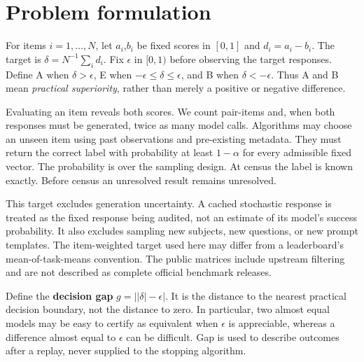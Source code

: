 \section{Problem formulation}\label{sec:3}\label{problem-formulation}

For items \(i=1,\ldots,N\), let \(a_i\),\(b_i\) be fixed scores in \([0,1]\) and \(d_i=a_i-b_i\). The target is \(\delta=N^{-1}\sum_i d_i\). Fix \(\epsilon\) in \([0,1)\) before observing the target responses. Define A when \(\delta>\epsilon\), E when \(-\epsilon\le\delta\le\epsilon\), and B when \(\delta<-\epsilon\). Thus A and B mean \emph{practical superiority}, rather than merely a positive or negative difference.

Evaluating an item reveals both scores. We count pair-items and, when both responses must be generated, twice as many model calls. Algorithms may choose an unseen item using past observations and pre-existing metadata. They must return the correct label with probability at least \(1-\alpha\) for every admissible fixed vector. The probability is over the sampling design. At census the label is known exactly. Before census an unresolved result remains unresolved.

This target excludes generation uncertainty. A cached stochastic response is treated as the fixed response being audited, not an estimate of its model's success probability. It also excludes sampling new subjects, new questions, or new prompt templates. The item-weighted target used here may differ from a leaderboard's mean-of-task-means convention. The public matrices include upstream filtering and are not described as complete official benchmark releases.

Define the \textbf{decision gap} \(g=\bigl||\delta|-\epsilon\bigr|\). It is the distance to the nearest practical decision boundary, not the distance to zero. In particular, two almost equal models may be easy to certify as equivalent when \(\epsilon\) is appreciable, whereas a difference almost equal to \(\epsilon\) can be difficult. Gap is used to describe outcomes after a replay, never supplied to the stopping algorithm.
